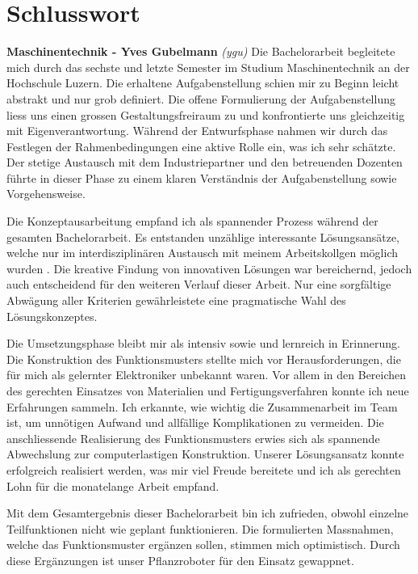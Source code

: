 \newpage
\section{Schlusswort}

\textbf{Maschinentechnik - Yves Gubelmann}
\newline
\textit{(ygu)} Die Bachelorarbeit begleitete mich durch das sechste und letzte Semester im Studium Maschinentechnik an der Hochschule Luzern. Die erhaltene Aufgabenstellung schien mir zu Beginn leicht abstrakt und nur grob definiert. Die offene Formulierung der Aufgabenstellung liess uns einen grossen Gestaltungsfreiraum  zu und konfrontierte uns gleichzeitig mit Eigenverantwortung. Während der Entwurfsphase nahmen wir durch das Festlegen der Rahmenbedingungen eine aktive Rolle ein, was ich sehr schätzte. Der stetige Austausch mit dem Industriepartner und den betreuenden Dozenten führte in dieser Phase zu einem klaren Verständnis der Aufgabenstellung sowie Vorgehensweise.
\newline

Die Konzeptausarbeitung empfand ich als spannender Prozess während der gesamten Bachelorarbeit. Es entstanden unzählige interessante Lösungsansätze, welche nur im interdisziplinären Austausch mit meinem Arbeitskollgen möglich wurden . Die kreative Findung von innovativen Lösungen war bereichernd, jedoch auch entscheidend für den weiteren Verlauf dieser Arbeit. Nur eine sorgfältige Abwägung aller Kriterien gewährleistete eine pragmatische Wahl des Lösungskonzeptes.
\newline

Die Umsetzungsphase bleibt mir als intensiv sowie und lernreich in Erinnerung. Die Konstruktion des Funktionsmusters stellte mich vor Herausforderungen, die für mich als gelernter Elektroniker unbekannt waren. Vor allem in den Bereichen des gerechten Einsatzes von Materialien und Fertigungsverfahren konnte ich neue Erfahrungen sammeln. Ich erkannte, wie wichtig die Zusammenarbeit im Team ist, um unnötigen Aufwand und allfällige Komplikationen zu vermeiden. Die anschliessende Realisierung des Funktionsmusters erwies sich als spannende Abwechslung zur computerlastigen Konstruktion. 
Unserer Lösungsansatz konnte erfolgreich realisiert werden, was mir viel Freude bereitete und ich als gerechten Lohn für die monatelange Arbeit empfand.
\newline

Mit dem Gesamtergebnis dieser Bachelorarbeit bin ich zufrieden, obwohl einzelne Teilfunktionen nicht wie geplant funktionieren. Die formulierten Massnahmen, welche das Funktionsmuster ergänzen sollen, stimmen mich optimistisch. Durch diese Ergänzungen ist unser Pflanzroboter für den Einsatz gewappnet.
\newline

